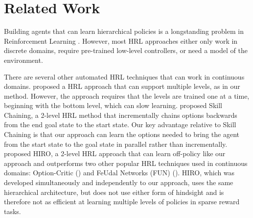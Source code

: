 \documentclass{article} %
\newcommand{\gdknote}[1]{\textcolor{blue}{\textbf{GDK: #1}}}
\begin{document}
\section{Related Work}

Building agents that can learn hierarchical policies is a longstanding problem in Reinforcement Learning \citep{SuttonPrecupSingh:99,Dietterich98themaxq,mcgovern2001automatic,Kulkarni_nips16,Menache2002QCutD,DBLP:conf/icml/SimsekWB05,DBLP:conf/nci/BakkerS04,DBLP:journals/adb/WieringS97}.  However, most HRL approaches either only work in discrete domains, require pre-trained low-level controllers, or need a model of the environment.

There are several other automated HRL techniques that can work in continuous domains.  \cite{schmid_early} proposed a HRL approach that can support multiple levels, as in our method.  However, the approach requires that the levels are trained one at a time, beginning with the bottom level, which can slow learning.  \cite{Konidaris2009SkillC} proposed Skill Chaining, a 2-level HRL method that incrementally chains options backwards from the end goal state to the start state.  Our key advantage  relative to Skill Chaining is that our approach can learn the options needed to bring the agent from the start state to the goal state in parallel rather than incrementally.  \cite{DBLP:journals/corr/abs-1805-08296} proposed HIRO, a 2-level HRL approach that can learn off-policy like our approach and outperforms two other popular HRL techniques used in continuous domains: Option-Critic (\cite{DBLP:journals/corr/BaconHP16}) and FeUdal Networks (FUN) (\cite{DBLP:journals/corr/VezhnevetsOSHJS17}).  
HIRO, which was developed simultaneously and independently to our approach, uses the same hierarchical architecture, but does not use either form of hindsight and is therefore not as efficient at learning multiple levels of policies in sparse reward tasks.

\end{document}

